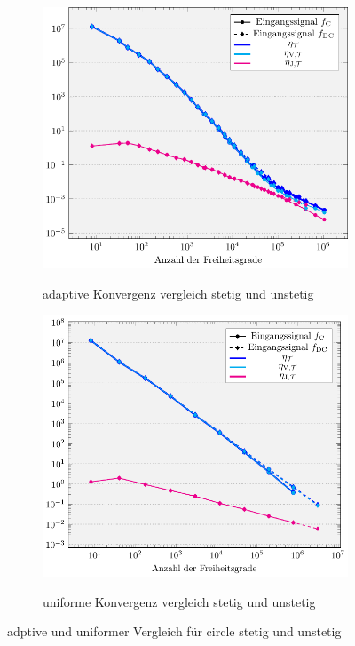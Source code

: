 \begin{figure}[p]
  \centering
  \begin{subfigure}[b]{.48\linewidth}
    \centering
    \caption{adaptive Konvergenz vergleich stetig und unstetig}
    \includegraphics[width=\linewidth]
      {pictures/chapExperiments/secGrayscale/circ/convAdap.pdf}
    \label{fig:circConvAdaptive}
  \end{subfigure}
  \quad
  \begin{subfigure}[b]{.48\linewidth}
    \centering
    \caption{uniforme Konvergenz vergleich stetig und unstetig}
    \includegraphics[width=\linewidth]
      {pictures/chapExperiments/secGrayscale/circ/convUnif.pdf}
    \label{fig:circConvUniform}
  \end{subfigure}
  \caption{adptive und uniformer Vergleich für circle stetig und unstetig}
  \label{fig:circConvComparison}
\end{figure}


